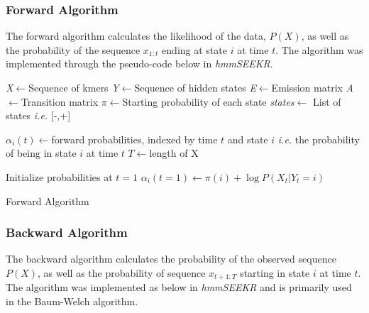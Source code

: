 \clearpage

\subsubsection{Forward Algorithm}
The forward algorithm calculates the likelihood of the data, $P(X)$, as well as the probability of the sequence $x_{1:t}$ ending at state $i$ at time $t$. The algorithm was implemented through the pseudo-code below in \emph{hmmSEEKR}. 

\begin{algorithm}[H]
\DontPrintSemicolon
{}
\SetAlgoLined
\emph{X}$\leftarrow$Sequence of kmers\;
\emph{Y}$\leftarrow$Sequence of hidden states\;
\emph{E}$\leftarrow$Emission matrix\;
\emph{A}$\leftarrow$Transition matrix\;
\emph{$\pi$}$\leftarrow$Starting probability of each state\;
\emph{states}$\leftarrow$ List of states \emph{i.e.} [-,+]\;
\;

$\alpha_i(t)\leftarrow$forward probabilities, indexed by time $t$ and state $i$ \emph{i.e.} the probability of being in state $i$ at time $t$\;
$T\leftarrow$length of X\;\; 

Initialize probabilities at $t=1$\;
$\alpha_i(t=1)\leftarrow \pi(i) + \log P(X_t |Y_t = i)$\;\;
 \caption{Forward Algorithm}
 \label{alg:fwd}
\end{algorithm}

\subsubsection{Backward Algorithm}
The backward algorithm calculates the probability of the observed sequence $P(X)$, as well as the probability of sequence $x_{t+1:T}$ starting in state $i$ at time $t$. The algorithm was implemented as below in \textit{hmmSEEKR} and is primarily used in the Baum-Welch algorithm. 

